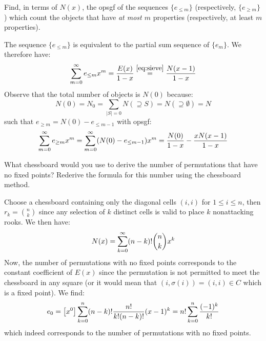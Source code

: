 \begin{exercise}
    Find, in terms of $N(x)$, the opsgf of the sequences $\{e_{\leq m}\}$ (respectively, $\{e_{\geq m}\}$) which count the objects that have \emph{at most $m$} properties (respectively, at least $m$ properties).
\end{exercise}
\begin{solution}
    The sequence $\{e_{\leq m}\}$ is equivalent to the partial sum sequence of $\{e_m\}$. We therefore have:
    \[
        \bsum[m] e_{\leq m}x^m = \frac{E(x)}{1-x} \estep{\eqref{eq:sieve}} \frac{N(x-1)}{1-x}
    \]
    Observe that the total number of objects is $N(0)$ because:
    \[
        N(0) = N_0 = \sum_{|S| = 0} N(\supseteq S) = N(\supseteq \emptyset) = N
    \]
    such that $e_{\geq m} = N(0) - e_{\leq m-1}$ with opsgf:
    \[
        \bsum[m] e_{\geq m}x^m =  \bsum[m] (N(0) - e_{\leq m-1})x^m = \frac{N(0)}{1-x} - \frac{xN(x-1)}{1-x}
    \]
\end{solution}

\begin{exercise}
    What chessboard would you use to derive the number of permutations that have no fixed points? Rederive the formula for this number using the chessboard method.
\end{exercise}
\begin{solution}
    Choose a chessboard containing only the diagonal cells $(i, i)$ for $1\leq i \leq n$, then $r_k = \binom{n}{k}$ since any selection of $k$ distinct cells is valid to place $k$ nonattacking rooks. We then have:
    \[
        N(x) = \bsum[k] (n-k)!\binom{n}{k}x^k 
    \]
    Now, the number of permutations with no fixed points corresponds to the constant coefficient of $E(x)$ since the permutation is not permitted to meet the chessboard in any square (or it would mean that $(i, \sigma(i)) = (i, i) \in C$ which is a fixed point). We find:
    \[
        e_0 = \coeff{x^0}\sum_{k=0}^n (n-k)! \frac{n!}{k!(n-k)!}(x-1)^k = n! \sum_{k=0}^n \frac{(-1)^k}{k!}
    \]
    which indeed corresponds to the number of permutations with no fixed points.
\end{solution}

